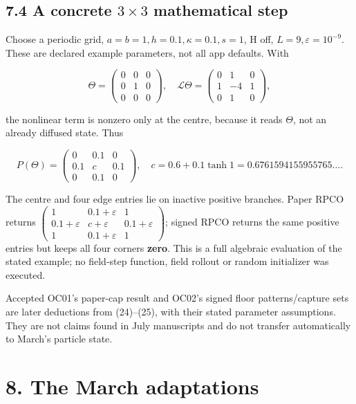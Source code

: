\documentclass[11pt,a4paper]{article}
\begin{document}
\subsection*{7.4 A concrete $3\times3$ mathematical step}

Choose a periodic grid, $a=b=1,h=0.1,\kappa=0.1,s=1$, H off, $L=9,\varepsilon=10^{-9}$. These are declared example parameters, not all app defaults. With


\[
\Theta=\begin{pmatrix}0&0&0\\0&1&0\\0&0&0\end{pmatrix},
\quad
\mathcal L\Theta=\begin{pmatrix}0&1&0\\1&-4&1\\0&1&0\end{pmatrix},
\]

the nonlinear term is nonzero only at the centre, because it reads $\Theta$, not an already diffused state. Thus


\[
P(\Theta)=
\begin{pmatrix}0&0.1&0\\0.1&c&0.1\\0&0.1&0\end{pmatrix},
\quad c=0.6+0.1\tanh1=0.6761594155955765\ldots. \tag{26}
\]

The centre and four edge entries lie on inactive positive branches. Paper RPCO returns
$\begin{pmatrix}1&0.1+\varepsilon&1\\0.1+\varepsilon&c+\varepsilon&0.1+\varepsilon\\1&0.1+\varepsilon&1\end{pmatrix}$;
signed RPCO returns the same positive entries but keeps all four corners \textbf{zero}. This is a full algebraic evaluation of the stated example; no field-step function, field rollout or random initializer was executed.


Accepted OC01's paper-cap result and OC02's signed floor patterns/capture sets are later deductions from (24)--(25), with their stated parameter assumptions. They are not claims found in July manuscripts and do not transfer automatically to March's particle state.


\clearpage
\section*{8. The March adaptations}
\end{document}
